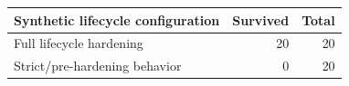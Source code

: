 \begin{tabular}{lrr}
\toprule
Synthetic lifecycle configuration & Survived & Total \\
\midrule
Full lifecycle hardening & 20 & 20 \\
Strict/pre-hardening behavior & 0 & 20 \\
\bottomrule
\end{tabular}
